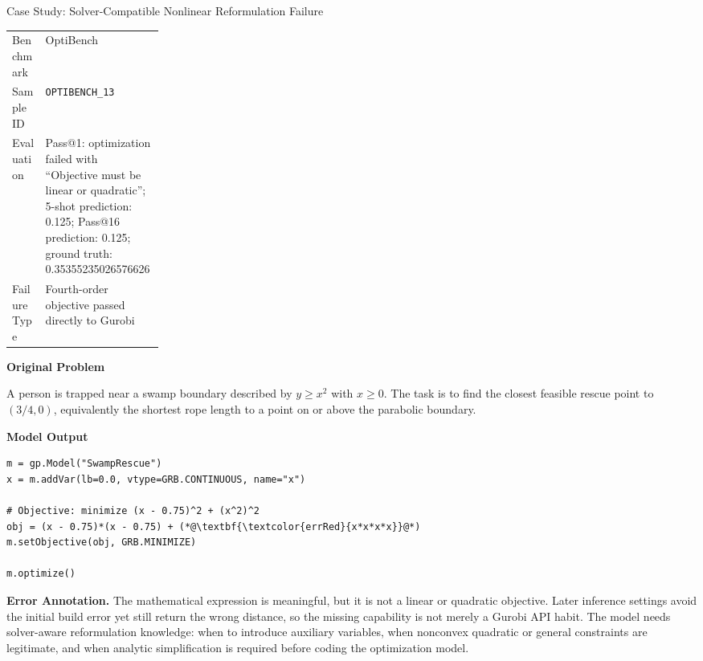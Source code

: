 \begin{casepage}{Case Study: Solver-Compatible Nonlinear Reformulation Failure}

\begin{tabularx}{\linewidth}{@{}p{0.22\linewidth}X@{}}
\toprule
Benchmark & OptiBench \\
Sample ID & \texttt{OPTIBENCH\_13} \\
Evaluation & Pass@1: optimization failed with ``Objective must be linear or quadratic''; 5-shot prediction: 0.125; Pass@16 prediction: 0.125; ground truth: 0.35355235026576626 \\
Failure Type & Fourth-order objective passed directly to Gurobi \\
\bottomrule
\end{tabularx}

\vspace{0.5em}
\textbf{Original Problem}

{\small
A person is trapped near a swamp boundary described by \(y \ge x^2\) with
\(x \ge 0\). The task is to find the closest feasible rescue point to
\((3/4,0)\), equivalently the shortest rope length to a point on or above the
parabolic boundary.
\par}

\vspace{0.5em}
\textbf{Model Output}

\begin{lstlisting}[style=pythoncase]
m = gp.Model("SwampRescue")
x = m.addVar(lb=0.0, vtype=GRB.CONTINUOUS, name="x")

# Objective: minimize (x - 0.75)^2 + (x^2)^2
obj = (x - 0.75)*(x - 0.75) + (*@\textbf{\textcolor{errRed}{x*x*x*x}}@*)
m.setObjective(obj, GRB.MINIMIZE)

m.optimize()
\end{lstlisting}

\vspace{0.3em}
\textbf{Error Annotation.}
The mathematical expression is meaningful, but it is not a linear or quadratic
objective. Later inference settings avoid the initial build error yet still
return the wrong distance, so the missing capability is not merely a Gurobi API
habit. The model needs solver-aware reformulation knowledge: when to introduce
auxiliary variables, when nonconvex quadratic or general constraints are
legitimate, and when analytic simplification is required before coding the
optimization model.

\end{casepage}